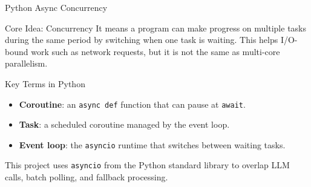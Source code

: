 \documentclass[
        11pt,
        compress,
        xcolor={dvipsnames}
    ]{beamer}
\begin{document}
\begin{frame}{Python Async Concurrency}
  \scriptsize
  \begin{block}{Core Idea: Concurrency}
    It means a program can make progress on multiple tasks during the same
    period by switching when one task is waiting. This helps I/O-bound work such as
    network requests, but it is not the same as multi-core parallelism.
  \end{block}
  \vspace{0.3em}
  \begin{block}{Key Terms in Python}
    \begin{itemize}\setlength{\itemsep}{0.3em}
      \item \textbf{Coroutine}: an \texttt{async def} function that can pause at \texttt{await}.
      \item \textbf{Task}: a scheduled coroutine managed by the event loop.
      \item \textbf{Event loop}: the \texttt{asyncio} runtime that switches between waiting tasks.
    \end{itemize}
  \end{block}
  \vspace{0.3em}
  \scriptsize
  This project uses \texttt{asyncio} from the Python standard library to overlap
  LLM calls, batch polling, and fallback processing.
\end{frame}
\end{document}
